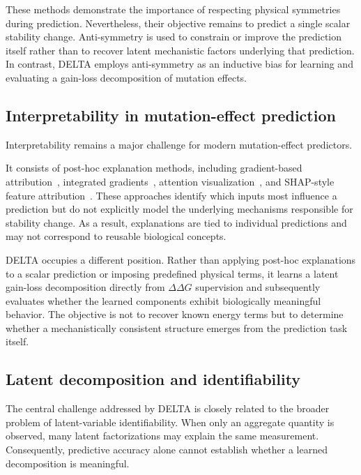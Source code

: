 \documentclass[11pt,a4paper]{article}
\theoremstyle{plain}
\theoremstyle{definition}
\begin{document}
These methods demonstrate the importance of respecting physical symmetries during prediction. Nevertheless, their objective remains to predict a single scalar stability change. Anti-symmetry is used to constrain or improve the prediction itself rather than to recover latent mechanistic factors underlying that prediction. In contrast, DELTA employs anti-symmetry as an inductive bias for learning and evaluating a gain-loss decomposition of mutation effects.

\subsection{Interpretability in mutation-effect prediction}

Interpretability remains a major challenge for modern mutation-effect predictors.

It consists of post-hoc explanation methods, including gradient-based attribution~\cite{selvaraju2017grad}, integrated gradients~\cite{sundararajan2017axiomatic}, attention visualization~\cite{vaswani2017attention,chen2021attention}, and SHAP-style feature attribution~\cite{lundberg2017unified}. These approaches identify which inputs most influence a prediction but do not explicitly model the underlying mechanisms responsible for stability change. As a result, explanations are tied to individual predictions and may not correspond to reusable biological concepts.

DELTA occupies a different position. Rather than applying post-hoc explanations to a scalar prediction or imposing predefined physical terms, it learns a latent gain-loss decomposition directly from $\Delta\Delta G$ supervision and subsequently evaluates whether the learned components exhibit biologically meaningful behavior. The objective is not to recover known energy terms but to determine whether a mechanistically consistent structure emerges from the prediction task itself.

\subsection{Latent decomposition and identifiability}

The central challenge addressed by DELTA is closely related to the broader problem of latent-variable identifiability. When only an aggregate quantity is observed, many latent factorizations may explain the same measurement. Consequently, predictive accuracy alone cannot establish whether a learned decomposition is meaningful.
\end{document}

